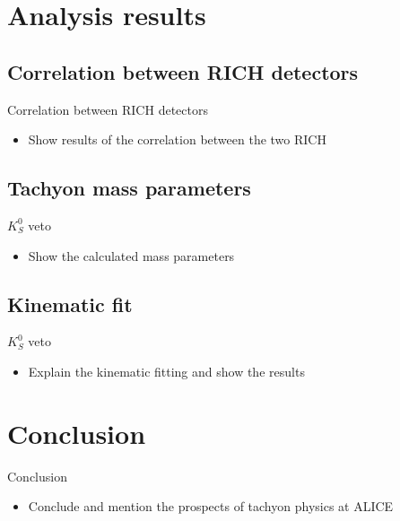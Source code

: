 \documentclass{beamer}
\begin{document}
\section{Analysis results}
\subsection{Correlation between RICH detectors}
\begin{frame}{Correlation between RICH detectors}
  \begin{itemize}
    \item{Show results of the correlation between the two RICH}
  \end{itemize}
\end{frame}

\subsection{Tachyon mass parameters}
\begin{frame}{$K_S^0$ veto}
  \begin{itemize}
    \item{Show the calculated mass parameters}
  \end{itemize}
\end{frame}

\subsection{Kinematic fit}
\begin{frame}{$K_S^0$ veto}
  \begin{itemize}
    \item{Explain the kinematic fitting and show the results}
  \end{itemize}
\end{frame}

\section{Conclusion}
\begin{frame}{Conclusion}
  \begin{itemize}
    \item{Conclude and mention the prospects of tachyon physics at ALICE}
  \end{itemize}
\end{frame}
\end{document}
